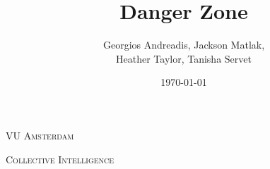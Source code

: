 \documentclass[12pt,a4paper]{report}
\title{Danger Zone}
\author{
    Georgios Andreadis, Jackson Matlak,\\
    Heather Taylor, Tanisha Servet
}
\date{\today}
\begin{document}
\begin{titlepage}
	\centering

	{\scshape\LARGE VU Amsterdam \par}
	\vspace{1cm}
	{\scshape\Large Collective Intelligence\par}
    \vspace{5cm}

	{\huge\bfseries \thetitle \par}
    \par\vspace{1cm}
	{\Large\itshape \theauthor \par}

	\vfill

	{\large \thedate \par}
\end{titlepage}


\tableofcontents








%
%
\end{document}
